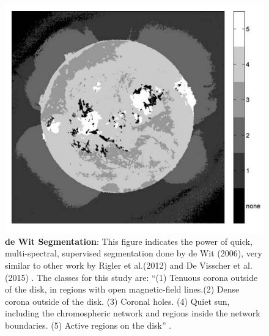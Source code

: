 \documentclass[twoside]{report}
\begin{document}
\begin{figure}[H]
  \begin{center}
    \includegraphics[scale=1]{dewit.png}
    \caption{{\bf de Wit Segmentation}: This figure indicates the power of quick, multi-spectral, supervised segmentation done by de Wit (2006), very similar to other work by Rigler et al.(2012) and De Visscher et al.(2015) \cite{dewit:2006}. The classes for this study are: ``(1) Tenuous corona outside of the disk, in regions with open magnetic-field lines.(2) Dense corona outside of the disk. (3) Coronal holes. (4) Quiet sun, including the chromospheric network and regions inside the network boundaries. (5) Active regions on the disk'' \cite{dewit:2006}. }
    \label{fig:dewit}
 \end{center}
\end{figure}
\end{document}
